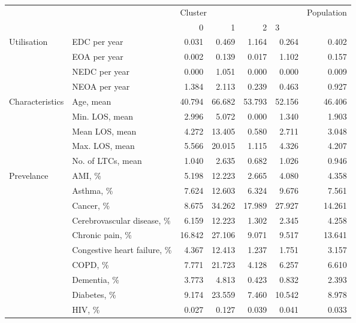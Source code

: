 \begin{tabular}{llrrrrr}
\toprule
           &                  & \multicolumn{4}{l}{Cluster} & Population \\
           &                  &       0 &       1 &       2 & \multicolumn{2}{l}{3} \\
\midrule
Utilisation & EDC per year &   0.031 &   0.469 &   1.164 &   0.264 &      0.402 \\
           & EOA per year &   0.002 &   0.139 &   0.017 &   1.102 &      0.157 \\
           & NEDC per year &   0.000 &   1.051 &   0.000 &   0.000 &      0.009 \\
           & NEOA per year &   1.384 &   2.113 &   0.239 &   0.463 &      0.927 \\
Characteristics & Age, mean &  40.794 &  66.682 &  53.793 &  52.156 &     46.406 \\
           & Min. LOS, mean &   2.996 &   5.072 &   0.000 &   1.340 &      1.903 \\
           & Mean LOS, mean &   4.272 &  13.405 &   0.580 &   2.711 &      3.048 \\
           & Max. LOS, mean &   5.566 &  20.015 &   1.115 &   4.326 &      4.207 \\
           & No. of LTCs, mean &   1.040 &   2.635 &   0.682 &   1.026 &      0.946 \\
Prevelance & AMI, \% &   5.198 &  12.223 &   2.665 &   4.080 &      4.358 \\
           & Asthma, \% &   7.624 &  12.603 &   6.324 &   9.676 &      7.561 \\
           & Cancer, \% &   8.675 &  34.262 &  17.989 &  27.927 &     14.261 \\
           & Cerebrovascular disease, \% &   6.159 &  12.223 &   1.302 &   2.345 &      4.258 \\
           & Chronic pain, \% &  16.842 &  27.106 &   9.071 &   9.517 &     13.641 \\
           & Congestive heart failure, \% &   4.367 &  12.413 &   1.237 &   1.751 &      3.157 \\
           & COPD, \% &   7.771 &  21.723 &   4.128 &   6.257 &      6.610 \\
           & Dementia, \% &   3.773 &   4.813 &   0.423 &   0.832 &      2.393 \\
           & Diabetes, \% &   9.174 &  23.559 &   7.460 &  10.542 &      8.978 \\
           & HIV, \% &   0.027 &   0.127 &   0.039 &   0.041 &      0.033 \\

\end{tabular}
